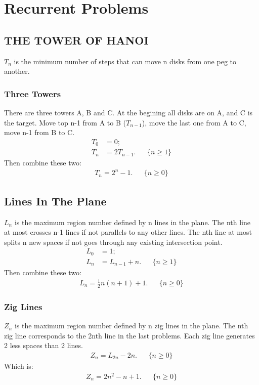 \documentclass{article}
\begin{document}
\section {Recurrent Problems}
\subsection{THE TOWER OF HANOI}
$T_n$ is the minimum number of steps that can move n disks from one peg to another.

\subsubsection{Three Towers}
There are three towers A, B and C.
At the begining all disks are on A, and C is the target.
Move top n-1 from A to B ($T_{n-1}$), move the last one from A to C, move n-1 from B to C.
\begin{align}
T_0 & = 0; \\ 
T_n & = 2T_{n-1}. && \{n \ge 1\}
\end{align}
Then combine these two:
\begin{align}
T_n = 2^n-1. && \{n\ge 0\}
\end{align}

\subsection{Lines In The Plane}
$L_n$ is the maximum region number defined by n lines in the plane.
The nth line at most crosses n-1 lines if not parallels to any other lines.
The nth line at most splits n new spaces if not goes through any existing intersection point.
\begin{align}
L_0 & = 1;\\
L_n & = L_{n-1} + n. && \{n \ge 1\}
\end{align}
Then combine these two:
\begin{align}
L_n = \frac {1}{2}n(n+1) + 1. && \{n \ge 0\}
\end{align}

\subsubsection{Zig Lines}
$Z_n$ is the maximum region number defined by n zig lines in the plane.
The nth zig line corresponds to the 2nth line in the last problems.
Each zig line generates 2 less spaces than 2 lines.
\begin{align}
Z_n = L_{2n} - 2n. && \{n \ge 0\}
\end{align}
Which is:
\begin{align}
Z_n = 2n^2-n+1. && \{n\ge 0\}
\end{align}
\end{document}
